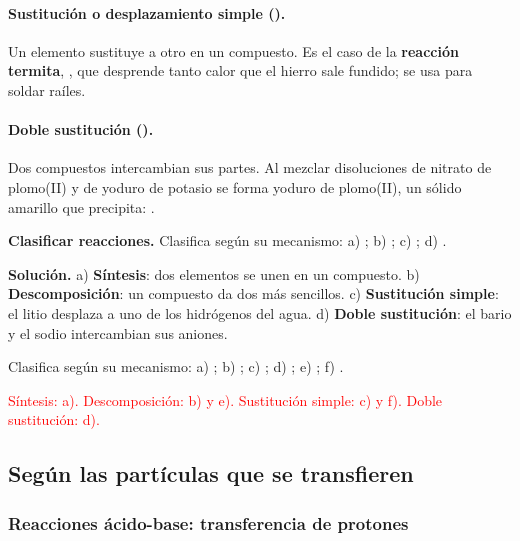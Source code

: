 \paragraph{Sustitución o desplazamiento simple ().} Un elemento sustituye a otro en un compuesto. Es el
caso de la \textbf{reacción termita}, , que desprende tanto calor que el hierro sale fundido;
se usa para soldar raíles.

\paragraph{Doble sustitución ().} Dos compuestos intercambian sus partes. Al mezclar disoluciones de
nitrato de plomo(II) y de yoduro de potasio se forma yoduro de plomo(II), un sólido amarillo que precipita:
.

\begin{example}
    \textbf{Clasificar reacciones.} Clasifica según su mecanismo: a) ;
    b) ; c) ; d) .

    \textbf{Solución.} a) \textbf{Síntesis}: dos elementos se unen en un compuesto. b) \textbf{Descomposición}: un compuesto da dos
    más sencillos. c) \textbf{Sustitución simple}: el litio desplaza a uno de los hidrógenos del agua. d) \textbf{Doble
    sustitución}: el bario y el sodio intercambian sus aniones.
\end{example}

\begin{exercise}
    Clasifica según su mecanismo: a) ; b) ;
    c) ; d) ; e) ;
    f) .
    \begin{solu}
        \textcolor{red}{Síntesis: a). Descomposición: b) y e). Sustitución simple: c) y f). Doble sustitución: d).}
    \end{solu}
\end{exercise}

\subsection{Según las partículas que se transfieren}

\subsubsection{Reacciones ácido-base: transferencia de protones}

